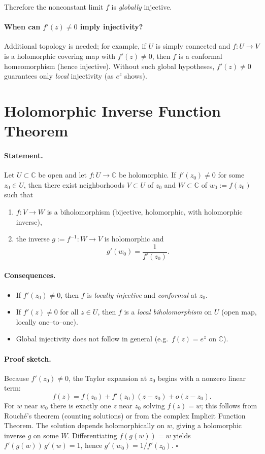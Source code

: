\documentclass[12pt,a4paper]{article}
\newcommand{\C}{\mathbb{C}}
\begin{document}
Therefore the nonconstant limit $f$ is \emph{globally} injective.

\bigskip
\paragraph{When can $f'(z)\neq 0$ imply injectivity?}
Additional topology is needed; for example, if $U$ is simply connected and
$f:U\to V$ is a holomorphic covering map with $f'(z)\neq 0$, then $f$ is a conformal
homeomorphism (hence injective).
Without such global hypotheses, $f'(z)\neq 0$ guarantees only \emph{local}
injectivity (as $e^{z}$ shows).

\section*{Holomorphic Inverse Function Theorem}

\paragraph{Statement.}
Let $U\subset\C$ be open and let $f:U\to\C$ be holomorphic.
If $f'(z_0)\neq 0$ for some $z_0\in U$, then there exist neighborhoods
$V\subset U$ of $z_0$ and $W\subset\C$ of $w_0:=f(z_0)$ such that
\begin{enumerate}
	\item $f:V\to W$ is a biholomorphism (bijective, holomorphic, with holomorphic inverse),
	\item the inverse $g:=f^{-1}:W\to V$ is holomorphic and
	\[
	g'(w_0)=\frac{1}{f'(z_0)}.
	\]
\end{enumerate}

\bigskip

\paragraph{Consequences.}
\begin{itemize}
	\item If $f'(z_0)\neq 0$, then $f$ is \emph{locally injective} and \emph{conformal} at $z_0$.
	\item If $f'(z)\neq 0$ for all $z\in U$, then $f$ is a \emph{local biholomorphism} on $U$
	(open map, locally one–to–one).
	\item Global injectivity does not follow in general (e.g.\ $f(z)=e^z$ on $\C$).
\end{itemize}

\bigskip

\paragraph{Proof sketch.}
Because $f'(z_0)\neq 0$, the Taylor expansion at $z_0$ begins with a nonzero linear term:
\[
f(z)=f(z_0)+f'(z_0)(z-z_0)+o(z-z_0).
\]
For $w$ near $w_0$ there is exactly one $z$ near $z_0$ solving $f(z)=w$; this follows from
Rouch\'e’s theorem (counting solutions) or from the complex Implicit Function Theorem.
The solution depends holomorphically on $w$, giving a holomorphic inverse $g$ on some $W$.
Differentiating $f(g(w))=w$ yields $f'(g(w))\,g'(w)=1$, hence $g'(w_0)=1/f'(z_0)$.
\hfill$\square$
\end{document}
